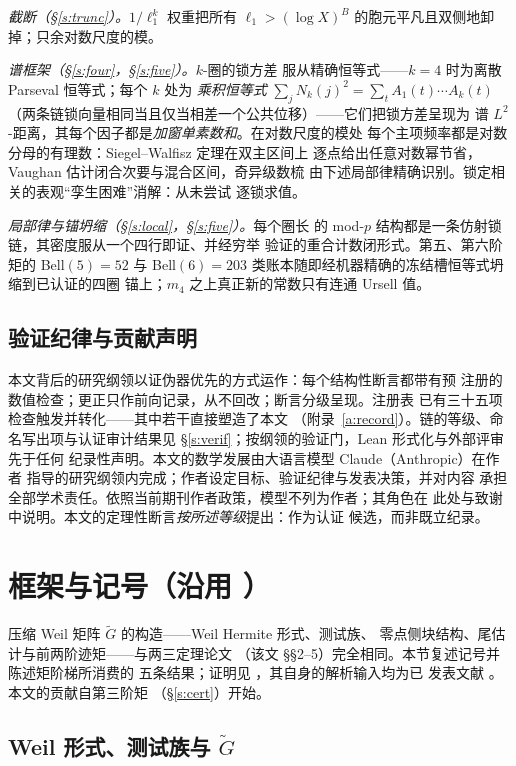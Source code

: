 \documentclass[11pt]{article}
\numberwithin{equation}{section}
\theoremstyle{definition}
\theoremstyle{remark}
\begin{document}
\emph{截断（\S\ref{s:trunc}）。}$1/\ell_1^{k}$ 权重把所有
$\ell_1>(\log X)^{B}$ 的胞元平凡且双侧地卸掉；只余对数尺度的模。

\emph{谱框架（\S\ref{s:four}，\S\ref{s:five}）。}$k$-圈的锁方差
服从精确恒等式——$k=4$ 时为离散 Parseval 恒等式；每个 $k$ 处为
\emph{乘积恒等式} $\sum_j N_k(j)^2=\sum_t A_1(t)\cdots A_k(t)$
（两条链锁向量相同当且仅当相差一个公共位移）——它们把锁方差呈现为
谱 $L^2$-距离，其每个因子都是\emph{加窗单素数和}。在对数尺度的模处
每个主项频率都是对数分母的有理数：Siegel--Walfisz 定理在双主区间上
逐点给出任意对数幂节省，Vaughan 估计闭合次要与混合区间，奇异级数梳
由下述局部律精确识别。锁定相关的表观``孪生困难''消解：从未尝试
逐锁求值。

\emph{局部律与锚坍缩（\S\ref{s:local}，\S\ref{s:five}）。}每个圈长
的 mod-$p$ 结构都是一条仿射锁链，其密度服从一个四行即证、并经穷举
验证的重合计数闭形式。第五、第六阶矩的 Bell$(5)=52$ 与
Bell$(6)=203$ 类账本随即经机器精确的冻结槽恒等式坍缩到已认证的四圈
锚上；$m_4$ 之上真正新的常数只有连通 Ursell 值。

\subsection*{验证纪律与贡献声明}

本文背后的研究纲领以证伪器优先的方式运作：每个结构性断言都带有预
注册的数值检查；更正只作前向记录，从不回改；断言分级呈现。注册表
已有三十五项检查触发并转化——其中若干直接塑造了本文
（附录~\ref{a:record}）。链的等级、命名写出项与认证审计结果见
\S\ref{s:verif}；按纲领的验证门，Lean 形式化与外部评审先于任何
纪录性声明。本文的数学发展由大语言模型 Claude（Anthropic）在作者
指导的研究纲领内完成；作者设定目标、验证纪律与发表决策，并对内容
承担全部学术责任。依照当前期刊作者政策，模型不列为作者；其角色在
此处与致谢中说明。本文的定理性断言\emph{按所述等级}提出：作为认证
候选，而非既立纪录。

\section{框架与记号（沿用 \cite{C26}）}\label{s:frame}

压缩 Weil 矩阵 $\widetilde G$ 的构造——Weil Hermite 形式、测试族、
零点侧块结构、尾估计与前两阶迹矩——与两三定理论文 \cite{C26}
（该文 \S\S2--5）完全相同。本节复述记号并陈述矩阶梯所消费的
\cite{C26} 五条结果；证明见 \cite{C26}，其自身的解析输入均为已
发表文献 \cite{Wei52,IK,Tit86,Mon73,BGST}。本文的贡献自第三阶矩
（\S\ref{s:cert}）开始。

\subsection{Weil 形式、测试族与 $\widetilde G$}\label{s:frame:G}
\end{document}
